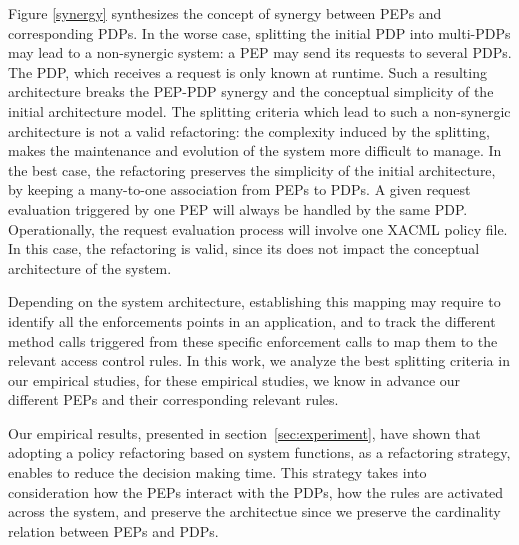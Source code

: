 Figure \ref{synergy} synthesizes the concept of synergy between PEPs and corresponding PDPs. In the worse case, splitting the initial PDP into multi-PDPs may lead to a non-synergic system: a PEP may send its requests to several PDPs. The PDP, which receives a request is only known at runtime. Such a resulting architecture breaks the PEP-PDP synergy and the conceptual 
simplicity of the initial architecture model. The splitting criteria which lead to such a non-synergic architecture is not a valid refactoring: 
the complexity induced by the splitting, makes the maintenance and evolution of the system more difficult to manage.
In the best case, the refactoring preserves the simplicity of the initial architecture, by keeping a many-to-one association from PEPs to PDPs. A given request evaluation 
triggered by one PEP will always be handled by the same PDP. Operationally, the request evaluation process will involve 
one XACML policy file. In this case, the refactoring is valid, since its does not impact the conceptual architecture of the system.

Depending on the system architecture, establishing this mapping may require to identify all the enforcements points in an application, and to 
track the different method calls 
triggered from these specific enforcement calls to map them to the relevant access control rules.  
In this work, we analyze the best splitting criteria in our empirical studies, for these empirical studies, we know in advance our different PEPs and their corresponding relevant rules. 

Our empirical results, presented in section~\ref{sec:experiment}, have shown that adopting a policy refactoring based on system functions, as a refactoring strategy, enables to 
reduce the decision making time. 
This strategy takes into consideration how the PEPs interact with the PDPs, how the rules are activated across the system, and preserve
the architectue 	since we preserve the cardinality relation between PEPs and PDPs.
 

